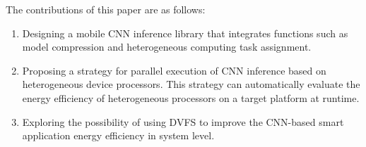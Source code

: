 \begin{enabstract}
The contributions of this paper are as follows:

\begin{enumerate}
  \item Designing a mobile CNN inference library that integrates functions such as model compression and heterogeneous computing task assignment.
  \item Proposing a strategy for parallel execution of CNN inference based on heterogeneous device processors. This strategy can automatically evaluate the energy efficiency of heterogeneous processors on a target platform at runtime.
  \item Exploring the possibility of using DVFS to improve the CNN-based smart application energy efficiency in system level.
\end{enumerate}

\end{enabstract}